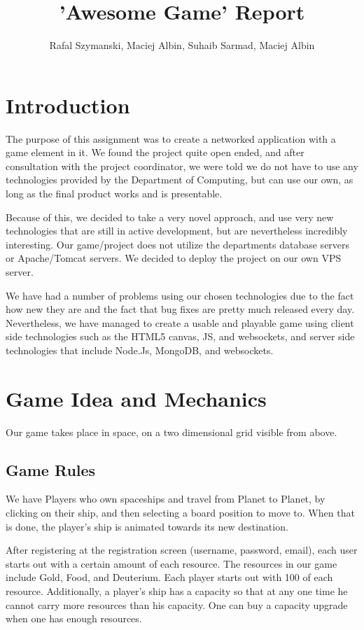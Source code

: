\documentclass[a4paper,11pt]{article}
\title{'Awesome Game' Report}
\author{Rafal Szymanski, Maciej Albin, Suhaib Sarmad, Maciej Albin}
\begin{document}
 
	\maketitle
	
	\tableofcontents
	\newpage
	
	\section{Introduction}
	
		The purpose of this assignment was to create a networked application with a game element in it. We found the project quite open ended, and after consultation with the project coordinator, we were told we do not have to use any technologies provided by the Department of Computing, but can use our own, as long as the final product works and is presentable.

		Because of this, we decided to take a very novel approach, and use very new technologies that are still in active development, but are nevertheless incredibly interesting. Our game/project does not utilize the departments database servers or Apache/Tomcat servers. We decided to deploy the project on our own VPS server.

		We have had a number of problems using our chosen technologies due to the fact how new they are and the fact that bug fixes are pretty much released every day. Nevertheless, we have managed to create a usable and playable game using client side technologies such as the HTML5 canvas, JS, and websockets, and server side technologies that include Node.Js, MongoDB, and websockets.
	
		
	\section{Game Idea and Mechanics}
	
		Our game takes place in space, on a two dimensional grid visible from above. 
	
		\subsection{Game Rules}
		
			We have Players who own spaceships and travel from Planet to Planet, by clicking on their ship, and then selecting a board position to move to. When that is done, the player's ship is animated towards its new destination.
		
			After registering at the registration screen (username, password, email), each user starts out with a certain amount of each resource. The resources in our game include Gold, Food, and Deuterium. Each player starts out with 100 of each resource. Additionally, a player's ship has a capacity so that at any one time he cannot carry more resources than his capacity. One can buy a capacity upgrade when one has enough resources.
		
\end{document}

